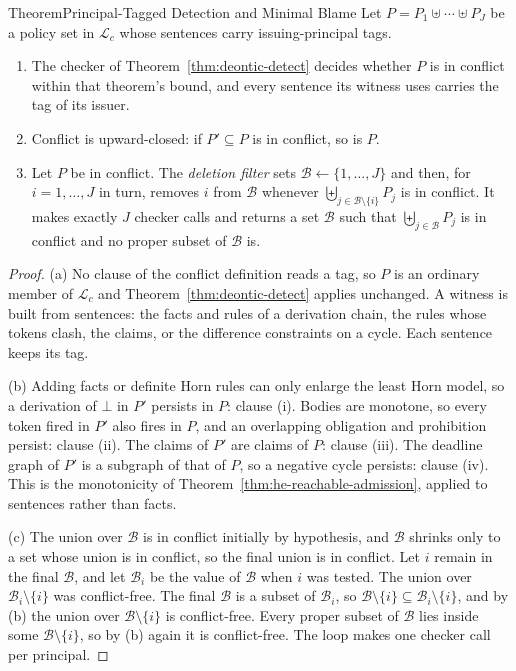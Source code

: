 \begin{pdclaim}{Theorem}{Principal-Tagged Detection and Minimal Blame}
\setlength{\parskip}{4pt plus 1pt}
\label{thm:he-tagged-blame}
Let $P=P_1\uplus\cdots\uplus P_J$ be a policy set in $\mathcal{L}_c$ whose
sentences carry issuing-principal tags.
\begin{enumerate}[leftmargin=1.8em,itemsep=1pt,label=(\alph*)]
\item The checker of Theorem~\ref{thm:deontic-detect} decides whether $P$ is
in conflict within that theorem's bound, and every sentence its witness uses
carries the tag of its issuer.
\item Conflict is upward-closed: if $P'\subseteq P$ is in conflict, so is $P$.
\item Let $P$ be in conflict. The \emph{deletion filter} sets
$\mathcal B\leftarrow\{1,\dots,J\}$ and then, for $i=1,\dots,J$ in turn, removes $i$
from $\mathcal B$ whenever $\biguplus_{j\in \mathcal B\setminus\{i\}}P_j$ is in conflict. It
makes exactly $J$ checker calls and returns a set $\mathcal B$ such that
$\biguplus_{j\in \mathcal B}P_j$ is in conflict and no proper subset of $\mathcal B$ is.
\end{enumerate}
\end{pdclaim}
\begin{proof}
\setlength{\parskip}{4pt plus 1pt}
(a) No clause of the conflict definition reads a tag, so $P$ is an ordinary
member of $\mathcal{L}_c$ and Theorem~\ref{thm:deontic-detect} applies
unchanged. A witness is built from sentences: the facts and rules of a
derivation chain, the rules whose tokens clash, the claims, or the difference
constraints on a cycle. Each sentence keeps its tag.

(b) Adding facts or definite Horn rules can only enlarge the least Horn model,
so a derivation of $\bot$ in $P'$ persists in $P$: clause (i). Bodies are
monotone, so every token fired in $P'$ also fires in $P$, and an overlapping
obligation and prohibition persist: clause (ii). The claims of $P'$ are claims
of $P$: clause (iii). The deadline graph of $P'$ is a subgraph of that of $P$,
so a negative cycle persists: clause (iv). This is the monotonicity of
Theorem~\ref{thm:he-reachable-admission}, applied to sentences rather than
facts.

(c) The union over $\mathcal B$ is in conflict initially by hypothesis, and $\mathcal B$ shrinks
only to a set whose union is in conflict, so the final union is in conflict.
Let $i$ remain in the final $\mathcal B$, and let $\mathcal B_i$ be the value of $\mathcal B$ when $i$ was
tested. The union over $\mathcal B_i\setminus\{i\}$ was conflict-free. The final $\mathcal B$ is
a subset of $\mathcal B_i$, so $\mathcal B\setminus\{i\}\subseteq \mathcal B_i\setminus\{i\}$, and by
(b) the union over $\mathcal B\setminus\{i\}$ is conflict-free. Every proper subset of
$\mathcal B$ lies inside some $\mathcal B\setminus\{i\}$, so by (b) again it is conflict-free.
The loop makes one checker call per principal.
\end{proof}

